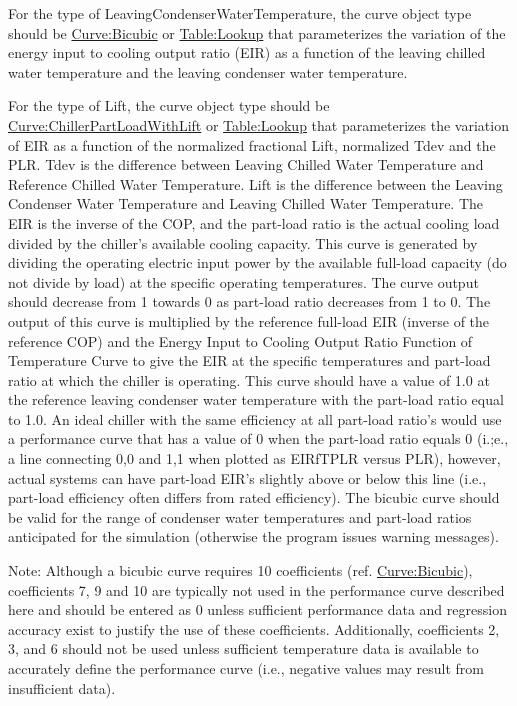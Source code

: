 For the type of LeavingCondenserWaterTemperature, the curve object type should be \hyperref[curvebicubic]{Curve:Bicubic} or \hyperref[tablelookup]{Table:Lookup} that parameterizes
the variation of the energy input to cooling output ratio (EIR) as a function of the leaving chilled water temperature and the leaving condenser water temperature.

For the type of Lift, the curve object type should be \hyperref[curvechillerpartloadwithlift]{Curve:ChillerPartLoadWithLift} or \hyperref[tablelookup]{Table:Lookup} that parameterizes the variation of EIR
as a function of the normalized fractional Lift, normalized Tdev and the PLR. Tdev is the difference between Leaving Chilled Water Temperature and Reference Chilled Water Temperature.
Lift is the difference between the Leaving Condenser Water Temperature and Leaving Chilled Water Temperature.
The EIR is the inverse of the COP, and the part-load ratio is the actual cooling load divided by the chiller's available cooling capacity.
This curve is generated by dividing the operating electric input power by the available full-load capacity (do not divide by load) at the specific operating temperatures.
The curve output should decrease from 1 towards 0 as part-load ratio decreases from 1 to 0.
The output of this curve is multiplied by the reference full-load EIR (inverse of the reference COP) and the Energy Input to Cooling Output Ratio Function of Temperature Curve
to give the EIR at the specific temperatures and part-load ratio at which the chiller is operating.
This curve should have a value of 1.0 at the reference leaving condenser water temperature with the part-load ratio equal to 1.0.
An ideal chiller with the same efficiency at all part-load ratio's would use a performance curve that has a value of 0 when the part-load ratio equals 0
(i.;e., a line connecting 0,0 and 1,1 when plotted as EIRfTPLR versus PLR), however, actual systems can have part-load EIR's slightly above or below this line
(i.e., part-load efficiency often differs from rated efficiency). The bicubic curve should be valid for the range of condenser water temperatures
and part-load ratios anticipated for the simulation (otherwise the program issues warning messages).

Note: Although a bicubic curve requires 10 coefficients (ref. \hyperref[curvebicubic]{Curve:Bicubic}), coefficients 7, 9 and 10 are typically not used in the performance curve described here and should be entered as 0 unless sufficient performance data and regression accuracy exist to justify the use of these coefficients. Additionally, coefficients 2, 3, and 6 should not be used unless sufficient temperature data is available to accurately define the performance curve (i.e., negative values may result from insufficient data).

